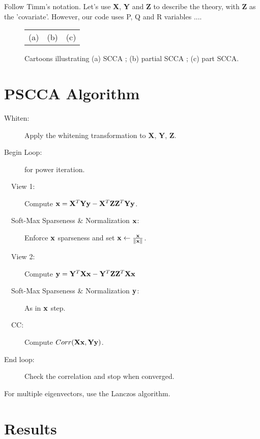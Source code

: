 \documentclass{llncs}
\newcommand{\X}{{\bf X}}
\newcommand{\x}{{\bf x}}
\newcommand{\Y}{{\bf Y}}
\newcommand{\y}{{\bf y}}
\newcommand{\Z}{{\bf Z}}
\begin{document}
Follow Timm's notation.  Let's use {\X}, {\Y} and {\Z} to describe the theory, with {\Z} as the
'covariate'.   However, our code uses P, Q and R variables ....
 

\begin{figure}
\begin{center}
\begin{tabular}{ccc}
(a) & (b) & (c) \\
\end{tabular}
\end{center}
\caption{\baselineskip 12pt \small Cartoons illustrating (a) SCCA ;
  (b) partial SCCA ; (c) part SCCA.  }
\label{fig:cartoon}
\end{figure}

\section{PSCCA Algorithm}
\vspace{0.1in}
\vspace{-0.1in}
\begin{description}
\item [Whiten:]Apply the whitening transformation to {\X}, {\Y}, {\Z}.
\item [Begin Loop:]for power iteration. 
\item [~~View 1:]Compute  $\x= {\X}^T {\Y} \y -  {\X}^T  {\Z} {\Z}^T {\Y} \y$.
\item [~~Soft-Max Sparseness \& Normalization $\x$:] Enforce $\x$
  sparseness and set $\x \leftarrow \frac{\x}{\|\x\|}$.
\item [~~View 2:]Compute  $\y= {\Y}^T {\X} \x -  {\Y}^T  {\Z} {\Z}^T
  {\X} \x$
\item [~~Soft-Max Sparseness \& Normalization $\y$:] As in $\x$ step.
\item [~~CC:]Compute $Corr( {\X} \x ,  {\Y} \y )$.
\item [End loop:]Check the correlation and stop when converged.
\end{description}
 
For multiple eigenvectors, use the Lanczos algorithm.

\section{Results}
\end{document}
